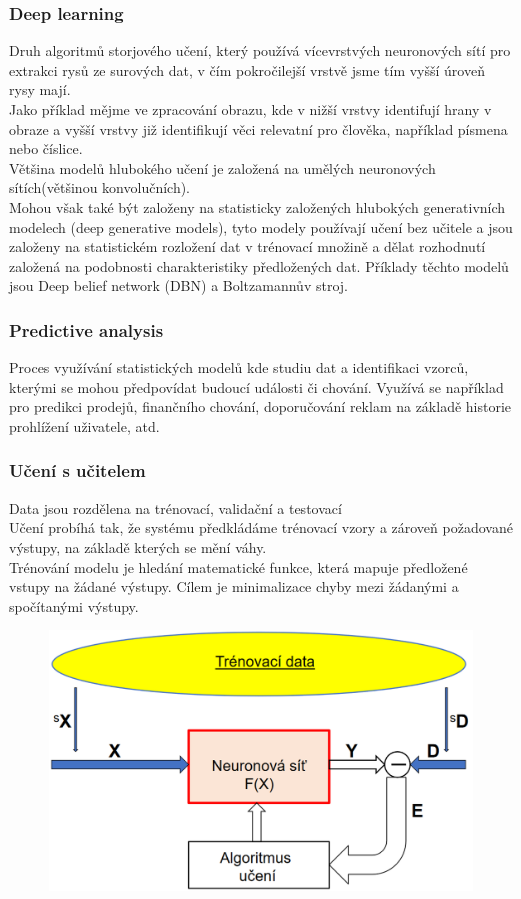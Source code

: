 \subsubsection{Deep learning}
Druh algoritmů storjového učení, který používá vícevrstvých neuronových sítí pro extrakci rysů ze surových dat, v čím pokročilejší vrstvě jsme tím vyšší úroveň rysy mají.\\
Jako příklad mějme ve zpracování obrazu, kde v nižší vrstvy identifují hrany v obraze a vyšší vrstvy již identifikují věci relevatní pro člověka, například písmena nebo číslice.\\
Většina modelů hlubokého učení je založená na umělých neuronových sítích(většinou konvolučních).\\
Mohou však také být založeny na statisticky založených hlubokých generativních modelech (deep generative models), tyto modely používají učení bez učitele a jsou založeny na statistickém rozložení dat v trénovací množině a dělat rozhodnutí založená na podobnosti charakteristiky předložených dat. Příklady těchto modelů jsou Deep belief network (DBN) a Boltzamannův stroj.\\
\subsubsection{Predictive analysis}
Proces využívání statistických modelů kde studiu dat a identifikaci vzorců, kterými se mohou předpovídat budoucí události či chování. Využívá se například pro predikci prodejů, finančního chování, doporučování reklam na základě historie prohlížení uživatele, atd.\\
\subsubsection{Učení s učitelem}
\label{typ_uceni}
Data jsou rozdělena na trénovací, validační a testovací\\
Učení probíhá tak, že systému předkládáme trénovací vzory a zároveň požadované výstupy, na základě kterých se mění váhy.\\
Trénování modelu je hledání matematické funkce, která mapuje předložené vstupy na žádané výstupy. Cílem je minimalizace chyby mezi žádanými a spočítanými výstupy.\\
\newpage
\begin{figure}[h!]
    \includegraphics[scale = 0.3]{images/sUcitelem.png}
\end{figure}

